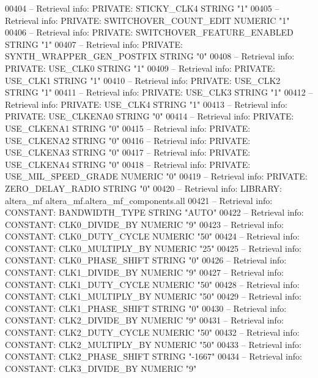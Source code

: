 \begin{DoxyCode}
{00404 \textcolor{keyword}{-- Retrieval info: PRIVATE: STICKY\_CLK4 STRING "1"}
00405 \textcolor{keyword}{-- Retrieval info: PRIVATE: SWITCHOVER\_COUNT\_EDIT NUMERIC "1"}
00406 \textcolor{keyword}{-- Retrieval info: PRIVATE: SWITCHOVER\_FEATURE\_ENABLED STRING "1"}
00407 \textcolor{keyword}{-- Retrieval info: PRIVATE: SYNTH\_WRAPPER\_GEN\_POSTFIX STRING "0"}
00408 \textcolor{keyword}{-- Retrieval info: PRIVATE: USE\_CLK0 STRING "1"}
00409 \textcolor{keyword}{-- Retrieval info: PRIVATE: USE\_CLK1 STRING "1"}
00410 \textcolor{keyword}{-- Retrieval info: PRIVATE: USE\_CLK2 STRING "1"}
00411 \textcolor{keyword}{-- Retrieval info: PRIVATE: USE\_CLK3 STRING "1"}
00412 \textcolor{keyword}{-- Retrieval info: PRIVATE: USE\_CLK4 STRING "1"}
00413 \textcolor{keyword}{-- Retrieval info: PRIVATE: USE\_CLKENA0 STRING "0"}
00414 \textcolor{keyword}{-- Retrieval info: PRIVATE: USE\_CLKENA1 STRING "0"}
00415 \textcolor{keyword}{-- Retrieval info: PRIVATE: USE\_CLKENA2 STRING "0"}
00416 \textcolor{keyword}{-- Retrieval info: PRIVATE: USE\_CLKENA3 STRING "0"}
00417 \textcolor{keyword}{-- Retrieval info: PRIVATE: USE\_CLKENA4 STRING "0"}
00418 \textcolor{keyword}{-- Retrieval info: PRIVATE: USE\_MIL\_SPEED\_GRADE NUMERIC "0"}
00419 \textcolor{keyword}{-- Retrieval info: PRIVATE: ZERO\_DELAY\_RADIO STRING "0"}
00420 \textcolor{keyword}{-- Retrieval info: LIBRARY: altera\_mf altera\_mf.altera\_mf\_components.all}
00421 \textcolor{keyword}{-- Retrieval info: CONSTANT: BANDWIDTH\_TYPE STRING "AUTO"}
00422 \textcolor{keyword}{-- Retrieval info: CONSTANT: CLK0\_DIVIDE\_BY NUMERIC "9"}
00423 \textcolor{keyword}{-- Retrieval info: CONSTANT: CLK0\_DUTY\_CYCLE NUMERIC "50"}
00424 \textcolor{keyword}{-- Retrieval info: CONSTANT: CLK0\_MULTIPLY\_BY NUMERIC "25"}
00425 \textcolor{keyword}{-- Retrieval info: CONSTANT: CLK0\_PHASE\_SHIFT STRING "0"}
00426 \textcolor{keyword}{-- Retrieval info: CONSTANT: CLK1\_DIVIDE\_BY NUMERIC "9"}
00427 \textcolor{keyword}{-- Retrieval info: CONSTANT: CLK1\_DUTY\_CYCLE NUMERIC "50"}
00428 \textcolor{keyword}{-- Retrieval info: CONSTANT: CLK1\_MULTIPLY\_BY NUMERIC "50"}
00429 \textcolor{keyword}{-- Retrieval info: CONSTANT: CLK1\_PHASE\_SHIFT STRING "0"}
00430 \textcolor{keyword}{-- Retrieval info: CONSTANT: CLK2\_DIVIDE\_BY NUMERIC "9"}
00431 \textcolor{keyword}{-- Retrieval info: CONSTANT: CLK2\_DUTY\_CYCLE NUMERIC "50"}
00432 \textcolor{keyword}{-- Retrieval info: CONSTANT: CLK2\_MULTIPLY\_BY NUMERIC "50"}
00433 \textcolor{keyword}{-- Retrieval info: CONSTANT: CLK2\_PHASE\_SHIFT STRING "-1667"}
00434 \textcolor{keyword}{-- Retrieval info: CONSTANT: CLK3\_DIVIDE\_BY NUMERIC "9"}
}
\end{DoxyCode}
